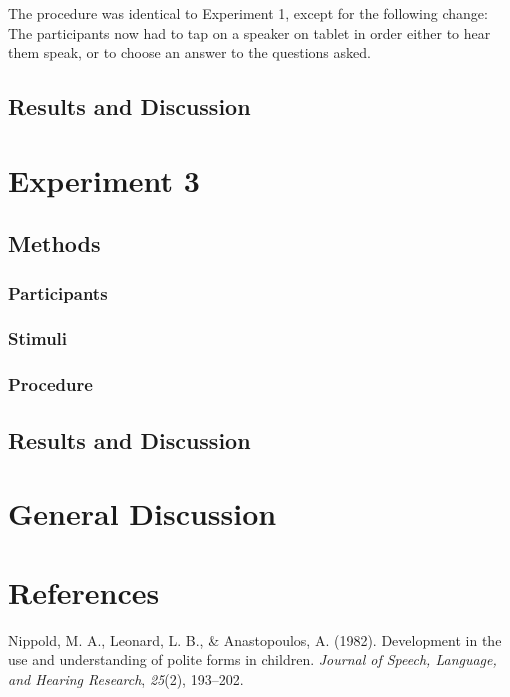 \documentclass[10pt, letterpaper]{article}
\begin{document}
The procedure was identical to Experiment 1, except for the following
change: The participants now had to tap on a speaker on tablet in order
either to hear them speak, or to choose an answer to the questions
asked.

\subsection{Results and Discussion}\label{results-and-discussion-1}

\section{Experiment 3}\label{experiment-3}

\subsection{Methods}\label{methods-2}

\subsubsection{Participants}\label{participants-2}

\subsubsection{Stimuli}\label{stimuli}

\subsubsection{Procedure}\label{procedure-2}

\subsection{Results and Discussion}\label{results-and-discussion-2}

\section{General Discussion}\label{general-discussion}

\section{References}\label{references}

\setlength{\parindent}{-0.1in} \setlength{\leftskip}{0.125in} \noindent

\hypertarget{refs}{}
\hypertarget{ref-nippold1982}{}
Nippold, M. A., Leonard, L. B., \& Anastopoulos, A. (1982). Development
in the use and understanding of polite forms in children. \emph{Journal
of Speech, Language, and Hearing Research}, \emph{25}(2), 193--202.
\end{document}
